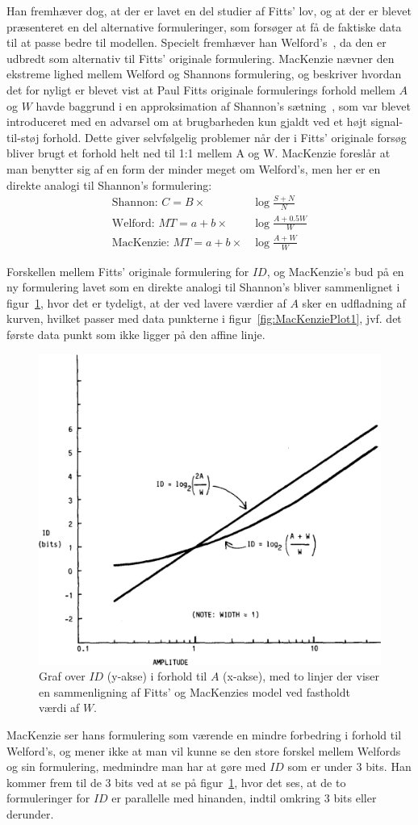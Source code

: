 Han fremhæver dog, at der er lavet en del studier af Fitts' lov, og at der er blevet præsenteret en del alternative formuleringer, som forsøger at få de faktiske data til at passe bedre til modellen. Specielt fremhæver han Welford's~\cite{welford1960,welford1968}, da den er udbredt som alternativ til Fitts' originale formulering. MacKenzie nævner den ekstreme lighed mellem Welford og Shannons formulering, og beskriver hvordan det for nyligt er blevet vist at Paul Fitts originale formulerings forhold mellem $A$ og $W$ havde baggrund i en approksimation af Shannon's sætning~\cite[p. 388]{fitts1954}, som var blevet introduceret med en advarsel om at brugbarheden kun gjaldt ved et højt signal-til-støj forhold. Dette giver selvfølgelig problemer når der i Fitts' originale forsøg bliver brugt et forhold helt ned til 1:1 mellem A og W. MacKenzie foreslår at man benytter sig af en form der minder meget om Welford's, men her er en direkte analogi til Shannon's formulering:
\begin{align}
\text{Shannon: }C=B\times&\log{\frac{S+N}{N}}\\
\text{Welford: }MT=a+b\times&\log{\frac{A+0.5W}{W}}\\
\text{MacKenzie: }MT=a+b\times&\log{\frac{A+W}{W}}
\end{align}

Forskellen mellem Fitts' originale formulering for $ID$, og MacKenzie's bud på en ny formulering lavet som en direkte analogi til Shannon's bliver sammenlignet i figur~\ref{fig:MacKenziePlot2}, hvor det er tydeligt, at der ved lavere værdier af $A$ sker en udfladning af kurven, hvilket passer med data punkterne i figur~\ref{fig:MacKenziePlot1}, jvf. det første data punkt som ikke ligger på den affine linje.\\
\begin{figure}[h]
\centering
\includegraphics[width=.5\linewidth]{images/illustrations/mackenzie_plot_2}
\caption{Graf over $ID$ (y-akse) i forhold til $A$ (x-akse), med to linjer der viser en sammenligning af Fitts' og MacKenzies model ved fastholdt værdi af $W$.}
\label{fig:MacKenziePlot2}
\end{figure}
MacKenzie ser hans formulering som værende en mindre forbedring i forhold til Welford's, og mener ikke at man vil kunne se den store forskel mellem Welfords og sin formulering, medmindre man har at gøre med $ID$ som er under 3 bits. Han kommer frem til de 3 bits ved at se på figur~\ref{fig:MacKenziePlot2}, hvor det ses, at de to formuleringer for $ID$ er parallelle med hinanden, indtil omkring 3 bits eller derunder.\\

